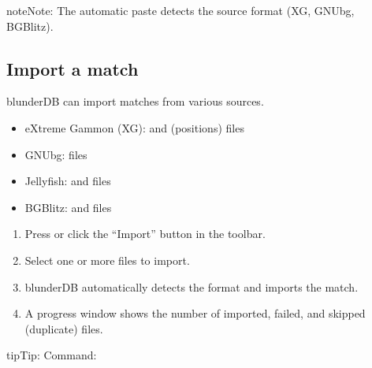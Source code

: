 \documentclass[letterpaper,10pt,english]{sphinxmanual}
\begin{document}
\begin{sphinxadmonition}{note}{Note:}
\sphinxAtStartPar
The automatic paste detects the source format (XG, GNUbg, BGBlitz).
\end{sphinxadmonition}


\subsection{Import a match}
\label{\detokenize{guide_utilisateur:importer-un-match}}
\sphinxAtStartPar
blunderDB can import matches from various sources.

\sphinxAtStartPar
{}
\begin{itemize}
\item {} 
\sphinxAtStartPar
eXtreme Gammon (XG):  and  (positions) files

\item {} 
\sphinxAtStartPar
GNUbg:  files

\item {} 
\sphinxAtStartPar
Jellyfish:  and  files

\item {} 
\sphinxAtStartPar
BGBlitz:  and  files

\end{itemize}

\sphinxAtStartPar
{}
\begin{enumerate}
%
\item {} 
\sphinxAtStartPar
Press  or click the “Import” button in the toolbar.

\item {} 
\sphinxAtStartPar
Select one or more files to import.

\item {} 
\sphinxAtStartPar
blunderDB automatically detects the format and imports the match.

\item {} 
\sphinxAtStartPar
A progress window shows the number of imported, failed, and skipped (duplicate) files.

\end{enumerate}

\begin{sphinxadmonition}{tip}{Tip:}
\sphinxAtStartPar
Command: 
\end{sphinxadmonition}
\end{document}
